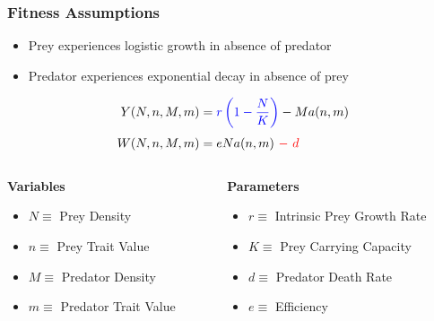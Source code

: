 \documentclass[10pt]{beamer}
\begin{document}
\begin{frame}
	\frametitle{Fitness Assumptions}
	\begin{itemize}
		\item Prey experiences {\color{blue}logistic growth} in absence of predator
		\item Predator experiences {\color{red}exponential decay} in absence of prey
	\end{itemize}
	\begin{align*}
		Y(N, n, M, m) &= {\color{blue}r\left(1 - \frac{N}{K}\right)} - Ma(n, m) \\[.1cm]
		W(N, n, M, m) &= eNa(n, m)\ {\color{red}-\ d}
	\end{align*}
	\begin{columns}
		\begin{column}{0.45\textwidth}
			{\bf Variables}
			\begin{itemize}
				\item \footnotesize$N \equiv $ Prey Density
				\item $n \equiv $ Prey Trait Value
				\item $M \equiv $ Predator Density
				\item $m \equiv $ Predator Trait Value
			\end{itemize}
		\end{column}
		\begin{column}{0.55\textwidth}
			{\bf Parameters}
			\begin{itemize}
				\item \footnotesize{\color{blue}$r \equiv $ Intrinsic Prey Growth Rate}
				\item {\color{blue}$K \equiv $ Prey Carrying Capacity}
				\item {\color{red}$d \equiv $ Predator Death Rate}
				\item $e \equiv $ Efficiency
			\end{itemize}
		\end{column}
	\end{columns}
\end{frame}
\end{document}

